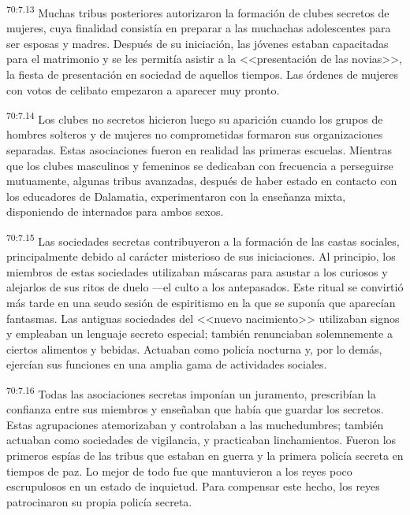 \par
\textsuperscript{70:7.13} Muchas tribus posteriores autorizaron la formación de clubes secretos de mujeres, cuya finalidad consistía en preparar a las muchachas adolescentes para ser esposas y madres. Después de su iniciación, las jóvenes estaban capacitadas para el matrimonio y se les permitía asistir a la <<presentación de las novias>>, la fiesta de presentación en sociedad de aquellos tiempos. Las órdenes de mujeres con votos de celibato empezaron a aparecer muy pronto.

\par
\textsuperscript{70:7.14} Los clubes no secretos hicieron luego su aparición cuando los grupos de hombres solteros y de mujeres no comprometidas formaron sus organizaciones separadas. Estas asociaciones fueron en realidad las primeras escuelas. Mientras que los clubes masculinos y femeninos se dedicaban con frecuencia a perseguirse mutuamente, algunas tribus avanzadas, después de haber estado en contacto con los educadores de Dalamatia, experimentaron con la enseñanza mixta, disponiendo de internados para ambos sexos.

\par
\textsuperscript{70:7.15} Las sociedades secretas contribuyeron a la formación de las castas sociales, principalmente debido al carácter misterioso de sus iniciaciones. Al principio, los miembros de estas sociedades utilizaban máscaras para asustar a los curiosos y alejarlos de sus ritos de duelo ---el culto a los antepasados. Este ritual se convirtió más tarde en una seudo sesión de espiritismo en la que se suponía que aparecían fantasmas. Las antiguas sociedades del <<nuevo nacimiento>> utilizaban signos y empleaban un lenguaje secreto especial; también renunciaban solemnemente a ciertos alimentos y bebidas. Actuaban como policía nocturna y, por lo demás, ejercían sus funciones en una amplia gama de actividades sociales.

\par
\textsuperscript{70:7.16} Todas las asociaciones secretas imponían un juramento, prescribían la confianza entre sus miembros y enseñaban que había que guardar los secretos. Estas agrupaciones atemorizaban y controlaban a las muchedumbres; también actuaban como sociedades de vigilancia, y practicaban linchamientos. Fueron los primeros espías de las tribus que estaban en guerra y la primera policía secreta en tiempos de paz. Lo mejor de todo fue que mantuvieron a los reyes poco escrupulosos en un estado de inquietud. Para compensar este hecho, los reyes patrocinaron su propia policía secreta.

